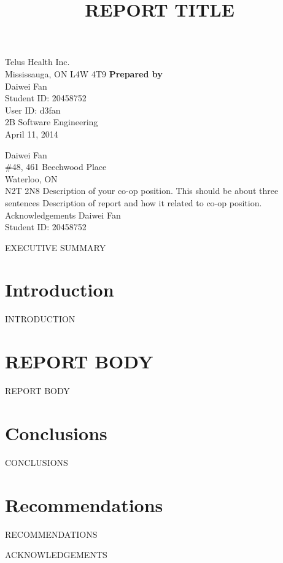 \documentclass[12pt]{article}
\begin{document}
\title{REPORT TITLE}
{
	Telus Health Inc.\\
	Mississauga, ON L4W 4T9
}
{
	\textbf{Prepared by}\\[2ex]
	
	Daiwei Fan\\
	Student ID: 20458752\\
	User ID: d3fan\\
	2B Software Engineering\\
	April 11, 2014
}


{
	\noindent
	Daiwei Fan\\
	\#48, 461 Beechwood Place\\
	Waterloo, ON\\
	N2T 2N8
}
{
	Description of your co-op position. This should be about three sentences
}
{
	Description of report and how it related to co-op position.
}
{
	Acknowledgements
}
{
	Daiwei Fan\\
	Student ID: 20458752
}


EXECUTIVE SUMMARY
\newpage


\toc


\section{Introduction}
INTRODUCTION


\section{REPORT BODY}
REPORT BODY


\section{Conclusions}
CONCLUSIONS


\section{Recommendations}
RECOMMENDATIONS


\newpage



\newpage


ACKNOWLEDGEMENTS
\newpage


\end{document}
